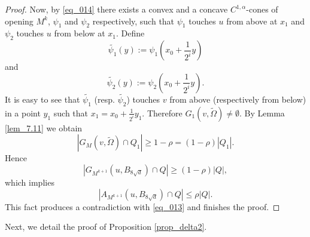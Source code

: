 \documentclass[10pt]{article} %
\begin{document}
\begin{proof}
Now, by \eqref{eq_014} there exists a convex and a concave $ C ^{1,\alpha}$-cones of opening $M^k$, $\psi_1$ and $\psi_2$ respectively, such that $\psi_1$ touches $u$ from above at $x_1$ and $\psi_2$ touches $u$ from below at $x_1$. Define
\[
\tilde{\psi_1}(y) := \psi_1\left(x_0+\frac{1}{2^i}y\right)
\]
and 
\[
\tilde{\psi_2}(y) := \psi_2\left(x_0+\frac{1}{2^i}y\right).
\]
It is easy to see that $\tilde{\psi_1}$ (resp. $\tilde{\psi_2}$) touches $v$ from above (respectively from below) in a point $y_1$ such that $x_1 = x_0 + \frac{1}{2^i}y_1$. Therefore $G_1(v, \tilde{\Omega}) \not= \emptyset$. By Lemma \ref{lem_7.11} we obtain
\[
|G_M(v, \tilde{\Omega})\cap Q_1| \geq 1-\rho = (1-\rho)|Q_1|.
\] 
Hence
\[
|G_{M^{k+1}}(u, B_{8\sqrt{d}})\cap Q| \geq (1-\rho)|Q|,
\]
which implies
\[
|A_{M^{k+1}}(u,B_{8\sqrt{d}})\cap Q| \leq \rho|Q|.
\]
This fact produces a contradiction with \eqref{eq_013} and finishes the proof.
\end{proof}

Next, we detail the proof of Proposition \ref{prop_delta2}.
\end{document}

